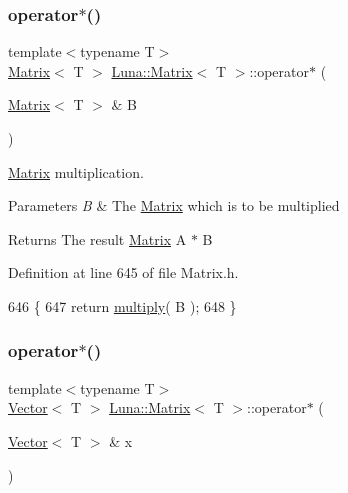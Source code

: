 \subsubsection{\texorpdfstring{operator$\ast$()}{operator*()}\hspace{0.1cm}{\footnotesize\ttfamily [2/3]}}
{\footnotesize\ttfamily template$<$typename T$>$ \\
\hyperlink{classLuna_1_1Matrix}{Matrix}$<$ T $>$ \hyperlink{classLuna_1_1Matrix}{Luna\+::\+Matrix}$<$ T $>$\+::operator$\ast$ (\begin{DoxyParamCaption}\item[{\hyperlink{classLuna_1_1Matrix}{Matrix}$<$ T $>$ \&}]{B }\end{DoxyParamCaption})\hspace{0.3cm}{\ttfamily [inline]}}



\hyperlink{classLuna_1_1Matrix}{Matrix} multiplication. 


\begin{DoxyParams}{Parameters}
{\em B} & The \hyperlink{classLuna_1_1Matrix}{Matrix} which is to be multiplied \\
\hline
\end{DoxyParams}
\begin{DoxyReturn}{Returns}
The result \hyperlink{classLuna_1_1Matrix}{Matrix} A $\ast$ B 
\end{DoxyReturn}


Definition at line 645 of file Matrix.\+h.


\begin{DoxyCode}
646   \{
647     \textcolor{keywordflow}{return} \hyperlink{classLuna_1_1Matrix_a0a55d0f67f6fdfc33f13e0d89225617d}{multiply}( B );
648   \}
\end{DoxyCode}
\mbox{\label{classLuna_1_1Matrix_a3be494c5342728a7ee22d20861e74e42}} 
\subsubsection{\texorpdfstring{operator$\ast$()}{operator*()}\hspace{0.1cm}{\footnotesize\ttfamily [3/3]}}
{\footnotesize\ttfamily template$<$typename T$>$ \\
\hyperlink{classLuna_1_1Vector}{Vector}$<$ T $>$ \hyperlink{classLuna_1_1Matrix}{Luna\+::\+Matrix}$<$ T $>$\+::operator$\ast$ (\begin{DoxyParamCaption}\item[{\hyperlink{classLuna_1_1Vector}{Vector}$<$ T $>$ \&}]{x }\end{DoxyParamCaption})\hspace{0.3cm}{\ttfamily [inline]}}



